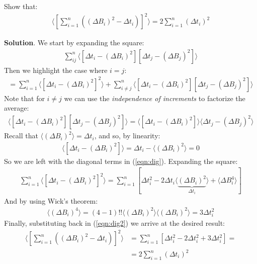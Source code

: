 \documentclass[../template.tex]{subfiles}
\begin{document}
\begin{exo}
    Show that:
    \begin{align*}
        \langle \left[\sum_{i=1}^n \left((\Delta B_i)^2 - \Delta t_i\right)\right]^2 \rangle = 2 \sum_{i=1}^n (\Delta t_i)^2
    \end{align*}

    \medskip

    \textbf{Solution}. We start by expanding the square:
    \begin{align*}
        \sum_{ij}^n \langle [\Delta t_i - (\Delta B_i)^2] [\Delta t_j - (\Delta B_j)^2]\rangle
    \end{align*}
    Then we highlight the case where $i = j$:
    \begin{align} \label{eqn:dig}
        = \sum_{i=1}^n \langle [\Delta t_i - (\Delta B_i)^2]^2 \rangle + \sum_{i \neq j}^n \langle [\Delta t_i - (\Delta B_i)^2] [\Delta t_j - (\Delta B_j)^2]\rangle
    \end{align}
    Note that for $i \neq j$ we can use the \textit{independence of increments} to factorize the average:
    \begin{align*}
        \langle [\Delta t_i - (\Delta B_i)^2] [\Delta t_j - (\Delta B_j)^2]\rangle = \langle [\Delta t_i - (\Delta B_i)^2] \rangle \langle \Delta t_j - (\Delta B_j)^2 \rangle
    \end{align*} 
    Recall that $\langle (\Delta B_i)^2 \rangle = \Delta t_i$, and so, by linearity:
    \begin{align*}
         \langle [\Delta t_i - (\Delta B_i)^2] \rangle=\Delta t_i -\langle (\Delta B_i)^2 \rangle = 0
    \end{align*}
    So we are left with the diagonal terms in (\ref{eqn:dig}). Expanding the square:
    \begin{align} \label{eqn:dig2}
        \sum_{i=1}^n \langle [\Delta t_i - (\Delta B_i)^2]^2 \rangle = \sum_{i=1}^n \left[\Delta t_i^2 - 2 \Delta t_i \langle \underbrace{(\Delta B_i)^2}_{\Delta t_i}  \rangle + \langle \Delta B_i^4 \rangle\right]
    \end{align}
    And by using Wick's theorem:
    \begin{align*}
        \langle (\Delta B_i)^4 \rangle = (4-1)!! \langle (\Delta B_i)^2 \rangle \langle (\Delta B_i)^2\rangle = 3 \Delta t_i^2
    \end{align*}
    Finally, substituting back in (\ref{eqn:dig2}) we arrive at the desired result:
    \begin{align*}
        \langle \left[\sum_{i=1}^n \left((\Delta B_i)^2 - \Delta t_i\right)\right]^2 \rangle &= \sum_{i=1}^n [\Delta t_i^2 - 2 \Delta t_i^2 + 3 \Delta t_i^2] =\\
        &= 2 \sum_{i=1}^n (\Delta t_i)^2
    \end{align*}
\end{exo}
\end{document}
